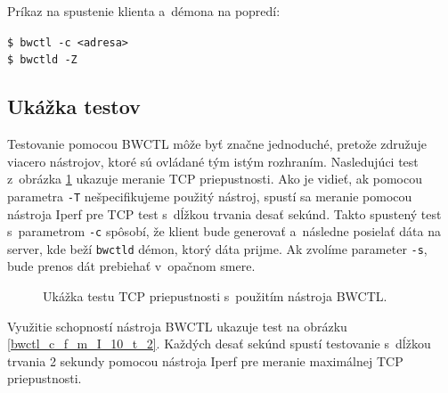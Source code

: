 \newpage

        \noindent Príkaz na spustenie klienta a~démona na popredí:

        \begin{flushleft}
            \texttt{\$ bwctl -c <adresa>} \\
            \texttt{\$ bwctld -Z }
        \end{flushleft}

        \subsection{Ukážka testov} \label{bwctl_testy}
        Testovanie pomocou BWCTL môže byť značne jednoduché, pretože združuje 
        viacero nástrojov, ktoré sú ovládané tým istým rozhraním. 
        Nasledujúci test z~obrázka \ref{bwctl_c_f_k} ukazuje meranie TCP
        priepustnosti. Ako je vidieť, ak pomocou parametra \texttt{-T}
        nešpecifikujeme použitý nástroj, spustí sa meranie pomocou nástroja Iperf 
        pre TCP test s~dĺžkou trvania desať sekúnd. Takto spustený test
        s~parametrom \texttt{-c} spôsobí, že klient bude generovať a~následne
        posielať dáta na server, kde beží \texttt{bwctld} démon, ktorý dáta prijme.
        Ak zvolíme parameter \texttt{-s}, bude prenos dát prebiehať v~opačnom
        smere. 

       \begin{figure}[H]
           \begin{center}
               \caption{Ukážka testu TCP priepustnosti s~použitím nástroja BWCTL.}
               \label{bwctl_c_f_k}
           \end{center}
       \end{figure}

       Využitie schopností nástroja BWCTL ukazuje test na obrázku
       \ref{bwctl_c_f_m_I_10_t_2}. Každých desať sekúnd spustí testovanie
       s~dĺžkou trvania 2 sekundy pomocou nástroja Iperf pre meranie maximálnej
       TCP priepustnosti.

